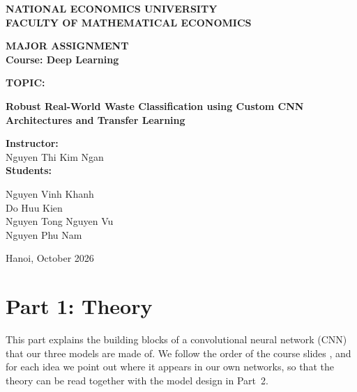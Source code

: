 \documentclass{article}
\newcommand{\topic}{Robust Real-World Waste Classification using Custom CNN Architectures and Transfer Learning}
\newcommand{\instructor}{Nguyen Thi Kim Ngan}
\newcommand{\students}{%
  Nguyen Vinh Khanh\\ Do Huu Kien\\ Nguyen Tong Nguyen Vu\\ Nguyen Phu Nam}
\begin{document}
\begin{titlepage}
\centering
{\fontsize{16}{20}\selectfont\bfseries NATIONAL ECONOMICS UNIVERSITY\\[2pt] FACULTY OF MATHEMATICAL ECONOMICS\par}
\vspace{3.2cm}
{\fontsize{18}{22}\selectfont\bfseries MAJOR ASSIGNMENT\\[4pt] Course: Deep Learning\par}
\vspace{1.4cm}
{\fontsize{20}{24}\selectfont\bfseries TOPIC:\par}
\vspace{0.4cm}
{\fontsize{18}{24}\selectfont\bfseries \topic\par}
\vspace{2.6cm}
\begin{flushleft}
\hspace*{8cm}\parbox[t]{6.5cm}{%
  {\fontsize{16}{20}\selectfont\bfseries Instructor:}\\[2pt]
  \hspace*{1.75cm}\instructor\\[10pt]
  {\fontsize{16}{20}\selectfont\bfseries Students:}\\[2pt]
  \hspace*{1.75cm}\parbox[t]{4.75cm}{\students}}
\end{flushleft}
\vfill
{Hanoi, October 2026\par}
\vspace{0.6cm}
\end{titlepage}

\section{Part 1: Theory}

This part explains the building blocks of a convolutional neural network (CNN) that our three models are made of. We follow the order of the course slides \cite{lec51, lec52, lec53}, and for each idea we point out where it appears in our own networks, so that the theory can be read together with the model design in Part~2.
\end{document}
